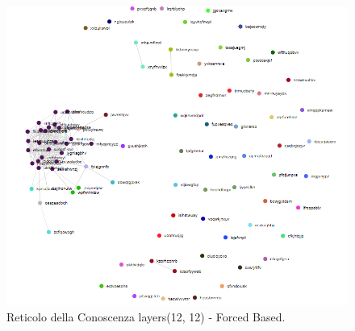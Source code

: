 \begin{figure}[H]
\centering
	\includegraphics[width=0.70\linewidth]{./image/logica(12,12)_forced.png}
	\caption{Reticolo della Conoscenza layers(12, 12) - Forced Based.}
	\label{Reticolo della Conoscenza layers(12, 12) - Forced Based.}
\end{figure}
\noindent

